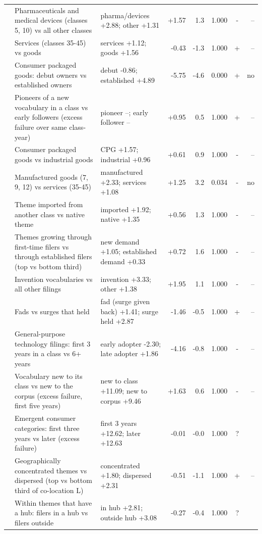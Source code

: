 {\begin{longtable}{>{\raggedright\arraybackslash}p{0.7cm}>{\raggedright\arraybackslash}p{4.6cm}>{\raggedright\arraybackslash}p{2.9cm}rrrcr}
12 & Pharmaceuticals and medical devices (classes 5, 10) vs all other classes & pharma/devices +2.88; other +1.31 & +1.57 & 1.3 & 1.000 & - & -- \\
13 & Services (classes 35-45) vs goods & services +1.12; goods +1.56 & -0.43 & -1.3 & 1.000 & + & -- \\
14 & Consumer packaged goods: debut owners vs established owners & debut -0.86; established +4.89 & -5.75 & -4.6 & 0.000 & + & no \\
15 & Pioneers of a new vocabulary in a class vs early followers (excess failure over same class-year) & pioneer --; early follower -- & +0.95 & 0.5 & 1.000 & + & -- \\
17 & Consumer packaged goods vs industrial goods & CPG +1.57; industrial +0.96 & +0.61 & 0.9 & 1.000 & - & -- \\
18 & Manufactured goods (7, 9, 12) vs services (35-45) & manufactured +2.33; services +1.08 & +1.25 & 3.2 & 0.034 & - & no \\
20 & Theme imported from another class vs native theme & imported +1.92; native +1.35 & +0.56 & 1.3 & 1.000 & - & -- \\
22 & Themes growing through first-time filers vs through established filers (top vs bottom third) & new demand +1.05; established demand +0.33 & +0.72 & 1.6 & 1.000 & - & -- \\
23 & Invention vocabularies vs all other filings & invention +3.33; other +1.38 & +1.95 & 1.1 & 1.000 & - & -- \\
24 & Fads vs surges that held & fad (surge given back) +1.41; surge held +2.87 & -1.46 & -0.5 & 1.000 & + & -- \\
25 & General-purpose technology filings: first 3 years in a class vs 6+ years & early adopter -2.30; late adopter +1.86 & -4.16 & -0.8 & 1.000 & - & -- \\
26 & Vocabulary new to its class vs new to the corpus (excess failure, first five years) & new to class +11.09; new to corpus +9.46 & +1.63 & 0.6 & 1.000 & - & -- \\
27 & Emergent consumer categories: first three years vs later (excess failure) & first 3 years +12.62; later +12.63 & -0.01 & -0.0 & 1.000 & ? &  \\
28 & Geographically concentrated themes vs dispersed (top vs bottom third of co-location L) & concentrated +1.80; dispersed +2.31 & -0.51 & -1.1 & 1.000 & + & -- \\
29 & Within themes that have a hub: filers in a hub vs filers outside & in hub +2.81; outside hub +3.08 & -0.27 & -0.4 & 1.000 & ? &  \\

\end{longtable}}
